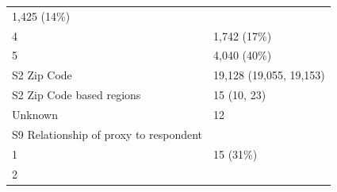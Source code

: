 \documentclass[]{article}
\begin{document}
\begin{longtable}[]{@{}ll@{}}
\begin{minipage}[t]{0.23\columnwidth}
1,425 (14\%)\strut
\end{minipage}\tabularnewline
\begin{minipage}[t]{0.71\columnwidth}\raggedright
4\strut
\end{minipage} & \begin{minipage}[t]{0.23\columnwidth}\raggedright
1,742 (17\%)\strut
\end{minipage}\tabularnewline
\begin{minipage}[t]{0.71\columnwidth}\raggedright
5\strut
\end{minipage} & \begin{minipage}[t]{0.23\columnwidth}\raggedright
4,040 (40\%)\strut
\end{minipage}\tabularnewline
\begin{minipage}[t]{0.71\columnwidth}\raggedright
S2 Zip Code\strut
\end{minipage} & \begin{minipage}[t]{0.23\columnwidth}\raggedright
19,128 (19,055, 19,153)\strut
\end{minipage}\tabularnewline
\begin{minipage}[t]{0.71\columnwidth}\raggedright
S2 Zip Code based regions\strut
\end{minipage} & \begin{minipage}[t]{0.23\columnwidth}\raggedright
15 (10, 23)\strut
\end{minipage}\tabularnewline
\begin{minipage}[t]{0.71\columnwidth}\raggedright
Unknown\strut
\end{minipage} & \begin{minipage}[t]{0.23\columnwidth}\raggedright
12\strut
\end{minipage}\tabularnewline
\begin{minipage}[t]{0.71\columnwidth}\raggedright
S9 Relationship of proxy to respondent\strut
\end{minipage} & \begin{minipage}[t]{0.23\columnwidth}\raggedright
\strut
\end{minipage}\tabularnewline
\begin{minipage}[t]{0.71\columnwidth}\raggedright
1\strut
\end{minipage} & \begin{minipage}[t]{0.23\columnwidth}\raggedright
15 (31\%)\strut
\end{minipage}\tabularnewline
\begin{minipage}[t]{0.71\columnwidth}\raggedright
2\strut
\end{minipage} & \begin{minipage}[t]{0.23\columnwidth}\raggedright

\end{minipage}
\end{longtable}
\end{document}
